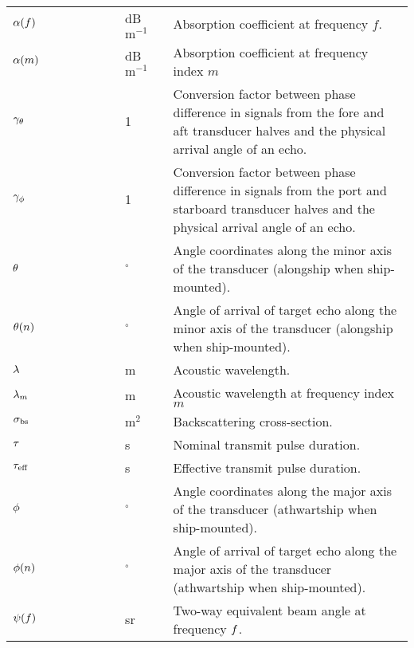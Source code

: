 \documentclass[12pt,a4paper]{article}
\begin{document}
\begin{longtable}{p{0.15\linewidth} p{0.13\linewidth} p{0.12\linewidth} p{0.6\linewidth} }
$\alpha(f)$  & & dB $\textrm{m}^{-1}$ & Absorption coefficient at frequency $f$.\\
$\alpha(m)$ & & dB $\textrm{m}^{-1}$ & Absorption coefficient at frequency index $m$\\
$\gamma_\theta$ & & 1 & Conversion factor between phase difference in signals from the fore and aft transducer halves and the physical arrival angle of an echo.\\
$\gamma_\phi$ & & 1 & Conversion factor between phase difference in signals from the port and starboard transducer halves and the physical arrival angle of an echo.\\
$\theta$ & & $^\circ$ & Angle coordinates along the minor axis of the transducer (alongship when ship-mounted).\\
$\theta(n)$ & & $^\circ$ & Angle of arrival of target echo along the minor axis of the transducer (alongship when ship-mounted).\\
$\lambda$ & & m &  Acoustic wavelength.\\
$\lambda_m$ & & m & Acoustic wavelength at frequency index $m$\\
$\sigma_{\textrm{bs}}$ & & $\textrm{m}^2$ & Backscattering cross-section.\\
$\tau$ & & s & Nominal transmit pulse duration.\\
$\tau_{\textrm{eff}}$ & & s & Effective transmit pulse duration.\\
$\phi$ & & $^\circ$ & Angle coordinates along the major axis of the transducer (athwartship when ship-mounted).\\
$\phi(n)$ & & $^\circ$ & Angle of arrival of target echo along the major axis of the transducer (athwartship when ship-mounted).\\
$\psi(f)$ & & sr & Two-way equivalent beam angle at frequency $f$.\\
\end{longtable}
\end{document}
